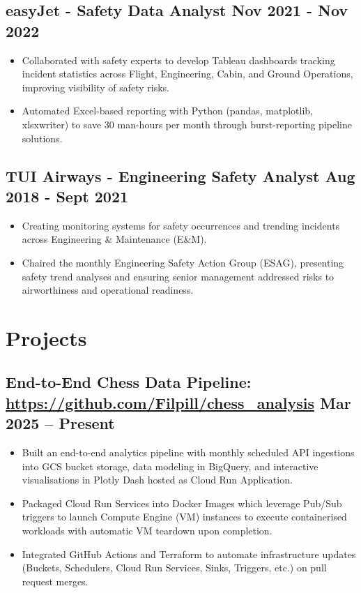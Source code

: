 \documentclass[a4paper, 10pt]{article}
\begin{document}
\subsection*{\textbf{easyJet - Safety Data Analyst} \hfill  Nov 2021 - Nov 2022}
\begin{itemize}[noitemsep]
    \item Collaborated with safety experts to develop Tableau dashboards tracking incident statistics across Flight, Engineering, Cabin, and Ground Operations, improving visibility of safety risks.
    \item Automated Excel-based reporting with Python (pandas, matplotlib, xlsxwriter) to save 30 man-hours per month through burst-reporting pipeline solutions.
\end{itemize}

\subsection*{\textbf{TUI Airways - Engineering Safety Analyst} \hfill  Aug 2018 - Sept 2021}
\begin{itemize}[noitemsep]
  \item Creating monitoring systems for safety occurrences and trending incidents across Engineering \& Maintenance (E\&M).
  \item Chaired the monthly Engineering Safety Action Group (ESAG), presenting safety trend analyses and ensuring senior management addressed risks to airworthiness and operational readiness.
\end{itemize}

\section*{Projects}
\vspace{-2.5mm}

\subsection*{\textbf{End-to-End Chess Data Pipeline}: \hspace{0mm} \url{https://github.com/Filpill/chess_analysis} \hfill  Mar 2025 – Present}
\begin{itemize}[noitemsep]
  \item Built an end-to-end analytics pipeline with monthly scheduled API ingestions into GCS bucket storage, data modeling in BigQuery, and interactive visualisations in Plotly Dash hosted as Cloud Run Application.
  \item Packaged Cloud Run Services into Docker Images which leverage Pub/Sub triggers to launch Compute Engine (VM) instances to execute containerised workloads with automatic VM teardown upon completion.
  \item Integrated GitHub Actions and Terraform to automate infrastructure updates (Buckets, Schedulers, Cloud Run Services, Sinks, Triggers, etc.) on pull request merges.
\end{itemize}
\end{document}
